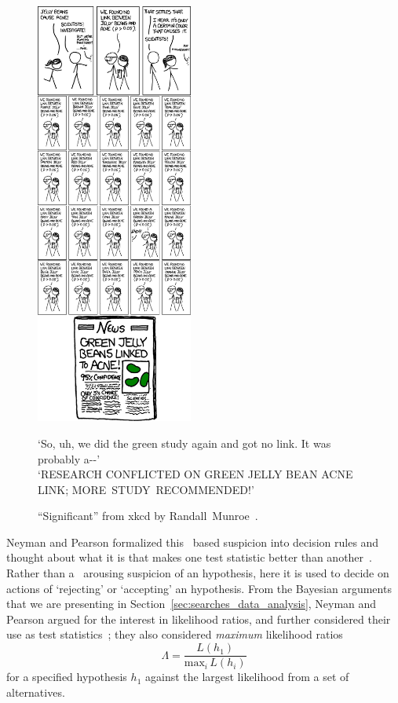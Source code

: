\begin{figure}[tp]
\centering
\includegraphics[width=0.46\textwidth]{figures/searches_significant_shrink.png}
\\
\begin{footnotesize}
`So, uh, we did the green study again and got no link. It was probably a{-}{-}'
\\
`RESEARCH CONFLICTED ON GREEN JELLY BEAN ACNE LINK; MORE~STUDY~RECOMMENDED!'
\end{footnotesize}
\caption[
``Significant'' from xkcd by Randall~Munroe
]{%
``Significant'' from xkcd by Randall~Munroe~\cite{xkcd2011significant}.
}
\label{fig:searches_significant}
\end{figure}

Neyman and Pearson formalized this \pvalue\ based suspicion into decision
rules and thought about what it is that makes one test statistic better than
another~\cite{neymanpearson1928max, neymanpearson1933lemma}.
Rather than a \pvalue\ arousing suspicion of an hypothesis, here it is used
to decide on actions of `rejecting' or `accepting' an hypothesis.
From the Bayesian arguments that we are presenting in
Section~\ref{sec:searches_data_analysis},
Neyman and Pearson argued for the interest in likelihood ratios, and further
considered their use as test statistics~\cite{neymanpearson1928max};
they also considered \emph{maximum} likelihood ratios
\begin{equation}
\label{eqn:searches_max_like_ratio}
\Lambda =
\frac{L(h_1)}{\mathrm{max}_i\,L(h_i)}
\end{equation}
for a specified hypothesis $h_1$ against the largest likelihood from a set
of alternatives.

